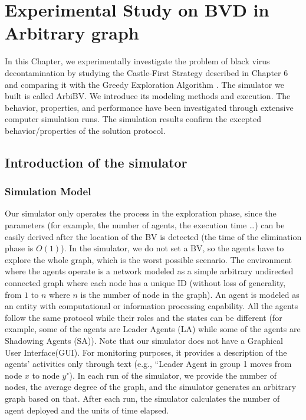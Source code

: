 
\chapter {Experimental Study on BVD in Arbitrary graph}
\label{Experiments}
 In this Chapter, we experimentally investigate the problem of black virus decontamination by studying the {\sc Castle-First} Strategy described in Chapter 6 and comparing it with the  {\sc Greedy} Exploration Algorithm \cite{cai}. 
The simulator we built is called {\sc ArbiBV}. We introduce its modeling methods and execution. The behavior, properties, and performance have been investigated through extensive computer simulation runs. The simulation results confirm the excepted behavior/properties of the solution protocol.
\section{Introduction of the simulator}
\subsection{Simulation Model}
Our simulator only operates the process in the exploration phase, since the parameters (for example, the number of agents, the execution time \ldots) can be easily derived after the location of the BV is detected (the time of the elimination phase is $O(1)$). In the simulator, we do not set a BV, so the agents have to explore the whole graph, which is the worst possible scenario. The environment where the agents operate is a network modeled as a simple arbitrary undirected connected graph where each node has a unique ID (without loss of generality, from $1$ to $n$ where $n$ is the number of node in the graph). An agent is modeled as an entity with computational or information processing capability. All the agents follow the same protocol while their roles and the states can be different (for example, some of the agents are Leader Agents (LA) while some of the agents are Shadowing Agents (SA)). Note that our simulator does not have a Graphical User Interface(GUI). For monitoring purposes,  it provides a description of the agents' activities only through text (e.g.,  ``Leader Agent in group 1 moves from node $x$ to node $y$").   In each run of the simulator, we provide the number of nodes, the average degree of the graph, and the simulator generates an arbitrary graph based on that. After each run, the simulator calculates the number of agent deployed and the units of time elapsed.

